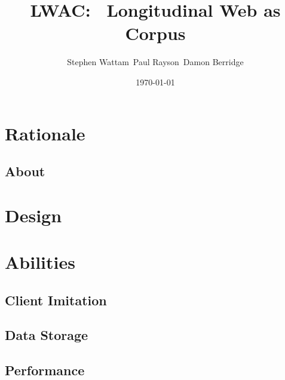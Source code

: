 \documentclass[xcolor=x11names,compress]{beamer}
\title{LWAC: \
Longitudinal Web as Corpus\vspace{15pt}}
\author{Stephen Wattam\
Paul Rayson\
Damon Berridge}
\institute[2013]{Lancaster University}
\date{\tiny \today}
\begin{document}
\maketitle

\section[Outline]{}
\frame{\tableofcontents}

\section{Rationale}
\subsection{About}


\section{Design}



\section{Abilities}


\subsection{Client Imitation}
\subsection{Data Storage}
\subsection{Performance}


\end{document}
